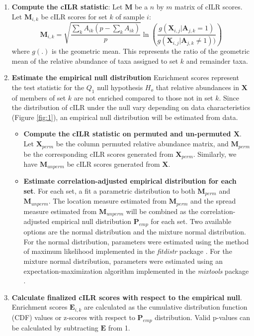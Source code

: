 \documentclass{article}
\begin{document}
\begin{enumerate}
    \item \textbf{Compute the cILR statistic}: Let $\mathbf{M}$ be a $n$ by $m$ matrix of cILR scores. Let $\mathbf{M}_{i,k}$ be cILR scores for set $k$ of sample $i$:   
    \begin{equation}\label{main_eq}
        \mathbf{M}_{i,k} = \sqrt{\frac{\sum_k A_{ik}(p - \sum_k A_{ik})}{p}} \ln \left( \frac{g(\mathbf{X}_{i,j}|\mathbf{A}_{j,k} = 1)}{g(\mathbf{X}_{i,j}|\mathbf{A}_{j,k} \neq 1))} \right)
    \end{equation}
    where $g(.)$ is the geometric mean. This represents the ratio of the geometric mean of the relative abundance of taxa assigned to set $k$ and remainder taxa. 
    \item \textbf{Estimate the empirical null distribution} Enrichment scores represent the test statistic for the $Q_1$ null hypothesis $H_o$ that relative abundances in $\mathbf{X}$ of members of set $k$ are not enriched compared to those not in set $k$. Since the distribution of cILR under the null vary depending on data characteristics (Figure \ref{fig:1}), an empirical null distribution will be estimated from data.
    \begin{itemize}
        \item \textbf{Compute the cILR statistic on permuted and un-permuted $\mathbf{X}$}.  Let $\mathbf{X}_{perm}$ be the column permuted relative abundance matrix, and $\mathbf{M}_{perm}$ be the corresponding cILR scores generated from $\mathbf{X}_{perm}$. Similarly, we have $\mathbf{M}_{unperm}$ be cILR scores generated from $\mathbf{X}$.
        \item \textbf{Estimate correlation-adjusted empirical distribution for each set}. For each set, a fit a parametric distribution to both $\mathbf{M}_{perm}$ and $\mathbf{M}_{unperm}$. The location measure estimated from $\mathbf{M}_{perm}$ and the spread measure estimated from $\mathbf{M}_{unperm}$ will be combined as the correlation-adjusted empirical null distribution $\mathbf{P}_{emp}$ for each set. Two available options are the normal distribution and the mixture normal distribution. For the normal distribution, parameters were estimated using the method of maximum likelihood implemented in the \emph{fitdistr} package \cite{delignette-muller2015}. For the mixture normal distribution, parameters were estimated using an expectation-maximization algorithm implemented in the \emph{mixtools} package \cite{benaglia2009}. 
    \end{itemize}
    \item \textbf{Calculate finalized cILR scores with respect to the empirical null}. Enrichment scores $\mathbf{E}_{i,k}$ are calculated as the cumulative distribution function (CDF) values or z-scores with respect to $\mathbf{P}_{emp}$ distribution. Valid p-values can be calculated by subtracting $\mathbf{E}$ from 1. 
\end{enumerate}
\end{document}
